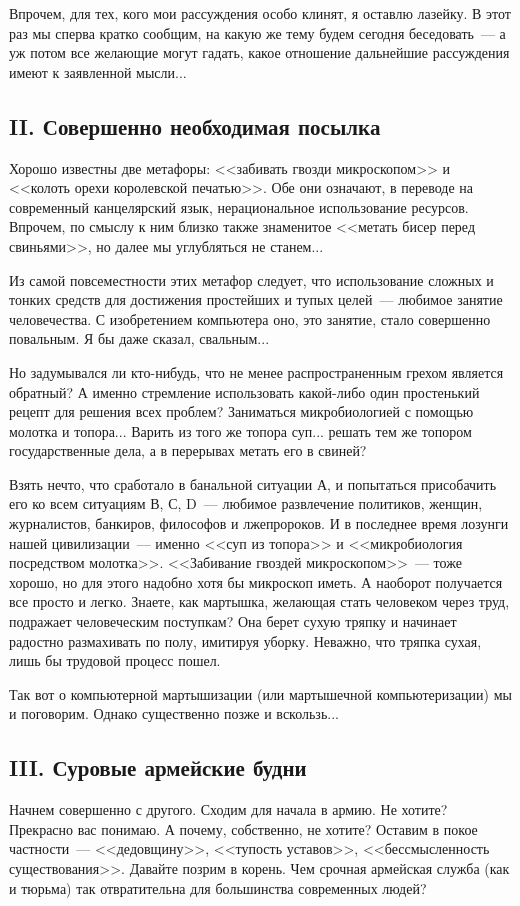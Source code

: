 \documentclass{scrbook}
\newcommand{\flqq}{<<}
\newcommand{\frqq}{>>}
\newcommand{\mdash}{~--- }
\newcommand{\essaysection}[1]{\subsection*{#1}\nopagebreak}
\begin{document}
Впрочем, для тех, кого мои рассуждения особо клинят, я оставлю лазейку. В этот раз мы сперва кратко сообщим, на какую же тему будем сегодня беседовать{\mdash}а уж потом все желающие могут гадать, какое отношение дальнейшие рассуждения имеют к заявленной мысли...

\essaysection{II. Совершенно необходимая посылка}

Хорошо известны две метафоры: {\flqq}забивать гвозди микроскопом{\frqq} и {\flqq}колоть орехи королевской печатью{\frqq}. Обе они означают, в переводе на современный канцелярский язык, нерациональное использование ресурсов. Впрочем, по смыслу к ним близко также знаменитое {\flqq}метать бисер перед свиньями{\frqq}, но далее мы углубляться не станем...

Из самой повсеместности этих метафор следует, что использование сложных и тонких средств для достижения простейших и тупых целей{\mdash}любимое занятие человечества. С изобретением компьютера оно, это занятие, стало совершенно повальным. Я бы даже сказал, свальным...

Но задумывался ли кто-нибудь, что не менее распространенным грехом является обратный? А именно стремление использовать какой-либо один простенький рецепт для решения всех проблем? Заниматься микробиологией с помощью молотка и топора... Варить из того же топора суп... решать тем же топором государственные дела, а в перерывах метать его в свиней?

Взять нечто, что сработало в банальной ситуации А, и попытаться присобачить его ко всем ситуациям В, С, D{\mdash}любимое развлечение политиков, женщин, журналистов, банкиров, философов и лжепророков. И в последнее время лозунги нашей цивилизации{\mdash}именно {\flqq}суп из топора{\frqq} и {\flqq}микробиология посредством молотка{\frqq}. {\flqq}Забивание гвоздей микроскопом{\frqq}{\mdash}тоже хорошо, но для этого надобно хотя бы микроскоп иметь. А наоборот получается все просто и легко. Знаете, как мартышка, желающая стать человеком через труд, подражает человеческим поступкам? Она берет сухую тряпку и начинает радостно размахивать по полу, имитируя уборку. Неважно, что тряпка сухая, лишь бы трудовой процесс пошел.

Так вот о компьютерной мартышизации (или мартышечной компьютеризации) мы и поговорим. Однако существенно позже и вскользь...

\essaysection{III. Суровые армейские будни}

Начнем совершенно с другого. Сходим для начала в армию. Не хотите? Прекрасно вас понимаю. А почему, собственно, не хотите? Оставим в покое частности{\mdash}{\flqq}дедовщину{\frqq}, {\flqq}тупость уставов{\frqq}, {\flqq}бессмысленность существования{\frqq}. Давайте позрим в корень. Чем срочная армейская служба (как и тюрьма) так отвратительна для большинства современных людей?
\end{document}
